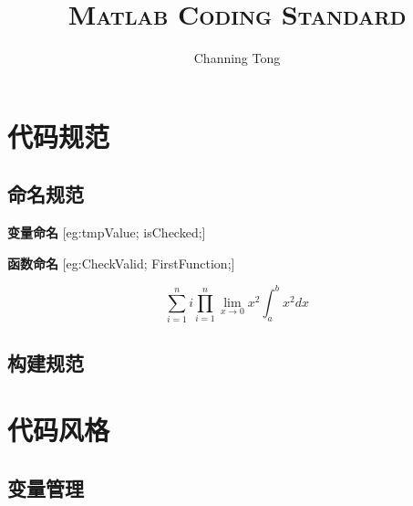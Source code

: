 \documentclass[UTF8]{ctexart}
\title{\Huge{\textsc{Matlab Coding Standard}}}
\author{\Large{Channing Tong}}
\begin{document}
\maketitle

\tableofcontents


\section{代码规范}

\subsection{命名规范}
\begin{description}
	\item{\textbf{变量命名}}		 
			[eg:tmpValue;		isChecked;]
	\item{\textbf{函数命名}}		 
			[eg:CheckValid;	FirstFunction;]
\end{description}


\[\sum_{i=1}^n i \prod_{i=1}^n \lim_{x\to0}x^2 \int_a^b x^2 dx\]
\subsection{构建规范}

\section{代码风格}

\subsection{变量管理}
\end{document}
